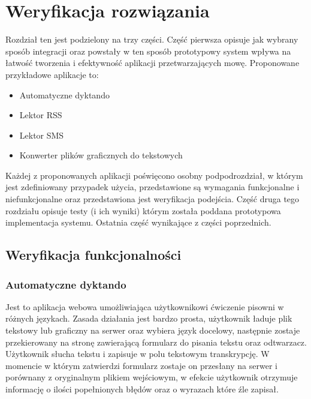 
\chapter{Weryfikacja rozwiązania} %



\ifpdf
    \graphicspath{{4/figures/PNG/}{4/figures/PDF/}{4/figures/}}
\else
    \graphicspath{{4/figures/EPS/}{4/figures/}}
\fi


Rozdział ten jest podzielony na trzy części. Część pierwsza opisuje jak wybrany sposób integracji oraz powstały w ten sposób prototypowy system wpływa na łatwość tworzenia i efektywność aplikacji przetwarzających mowę. Proponowane przykładowe aplikacje to:
\begin{itemize}
	\item Automatyczne dyktando
	\item Lektor RSS
	\item Lektor SMS
	\item Konwerter plików graficznych do tekstowych
\end{itemize}
Każdej z proponowanych aplikacji poświęcono osobny podpodrozdział, w którym jest zdefiniowany przypadek użycia, przedstawione są wymagania funkcjonalne i niefunkcjonalne oraz przedstawiona jest weryfikacja podejścia. Część druga tego rozdziału opisuje testy (i ich wyniki) którym została poddana prototypowa implementacja systemu. Ostatnia część wynikające z części poprzednich.

\section{Weryfikacja funkcjonalności}
\subsection{Automatyczne dyktando}
Jest to aplikacja webowa umożliwiająca użytkownikowi ćwiczenie pisowni w różnych językach. Zasada działania jest bardzo prosta, użytkownik ładuje plik tekstowy lub graficzny na serwer oraz wybiera język docelowy, następnie zostaje przekierowany na stronę zawierającą formularz do pisania tekstu oraz odtwarzacz. Użytkownik słucha tekstu i zapisuje w polu tekstowym transkrypcję. W momencie w którym zatwierdzi formularz zostaje on przesłany na serwer i porównany z oryginalnym plikiem wejściowym, w efekcie użytkownik otrzymuje informację o ilości popełnionych błędów oraz o wyrazach które źle zapisał. 

